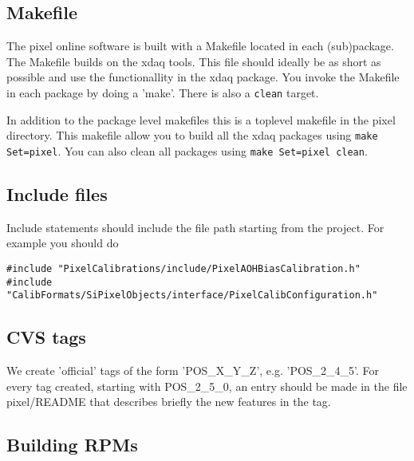 
\subsection{Makefile}

The pixel online software is built with a
Makefile located in each (sub)package. The
Makefile builds on the xdaq tools. This
file should ideally be as short as possible
and use the functionallity in the xdaq package.
You invoke the Makefile in each package by 
doing a 'make'. There is also a {\tt clean} target.

In addition to the package level makefiles 
this is a toplevel makefile in the pixel
directory. This makefile allow you to build 
all the xdaq packages using {\tt make Set=pixel}.
You can also clean all packages using 
{\tt make Set=pixel clean}.

\subsection{Include files}

Include statements should include the file path 
starting from the project. For example you should do

\begin{verbatim}
#include "PixelCalibrations/include/PixelAOHBiasCalibration.h"
#include "CalibFormats/SiPixelObjects/interface/PixelCalibConfiguration.h"
\end{verbatim}

\subsection{CVS tags}

We create 'official' tags of the form 'POS\_X\_Y\_Z',
e.g. 'POS\_2\_4\_5'. For every tag created, starting
with POS\_2\_5\_0, an entry should be made in the
file pixel/README that describes briefly the new
features in the tag.

\subsection{Building RPMs}


